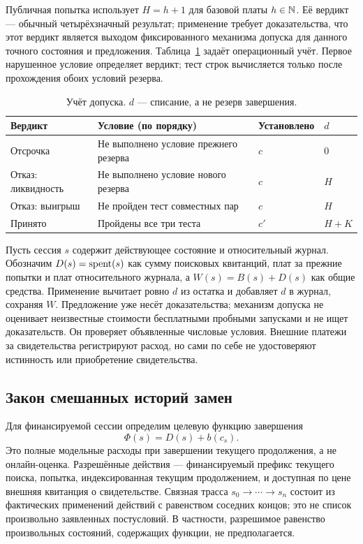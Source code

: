 Публичная попытка использует $H=h+1$ для базовой платы $h\in\mathbb N$. Её вердикт --- обычный четырёхзначный результат; применение требует доказательства, что этот вердикт является выходом фиксированного механизма допуска для данного точного состояния и предложения. Таблица~\ref{tab:debit} задаёт операционный учёт. Первое нарушенное условие определяет вердикт; тест строк вычисляется только после прохождения обоих условий резерва.
\begin{table}[htbp]
\centering\small
\caption{Учёт допуска. $d$ --- списание, а не резерв завершения.}\label{tab:debit}
\begin{tabularx}{\linewidth}{@{}lXll@{}}\toprule
Вердикт & Условие (по порядку) & Установлено & $d$\\\midrule
Отсрочка & Не выполнено условие прежнего резерва & $c$ & $0$\\
Отказ: ликвидность & Не выполнено условие нового резерва & $c$ & $H$\\
Отказ: выигрыш & Не пройден тест совместных пар & $c$ & $H$\\
Принято & Пройдены все три теста & $c'$ & $H+K$\\\bottomrule
\end{tabularx}
\end{table}

Пусть сессия $s$ содержит действующее состояние и относительный журнал. Обозначим $D(s)=\operatorname{spent}(s)$ как сумму поисковых квитанций, плат за прежние попытки и плат относительного журнала, а $W(s)=B(s)+D(s)$ как общие средства. Применение вычитает ровно $d$ из остатка и добавляет $d$ в журнал, сохраняя $W$. Предложение уже несёт доказательства; механизм допуска не оценивает неизвестные стоимости бесплатными пробными запусками и не ищет доказательств. Он проверяет объявленные числовые условия. Внешние платежи за свидетельства регистрируют расход, но сами по себе не удостоверяют истинность или приобретение свидетельства.

\subsection{Закон смешанных историй замен}
Для финансируемой сессии определим целевую функцию завершения
\begin{equation}\label{eq:root-objective}
 \Phi(s)=D(s)+b(c_s).
\end{equation}
Это полные модельные расходы при завершении текущего продолжения, а не онлайн-оценка. Разрешённые действия --- финансируемый префикс текущего поиска, попытка, индексированная текущим продолжением, и доступная по цене внешняя квитанция о свидетельстве. Связная трасса $s_0\to\cdots\to s_n$ состоит из фактических применений действий с равенством соседних концов; это не список произвольно заявленных постусловий. В частности, разрешимое равенство произвольных состояний, содержащих функции, не предполагается.

